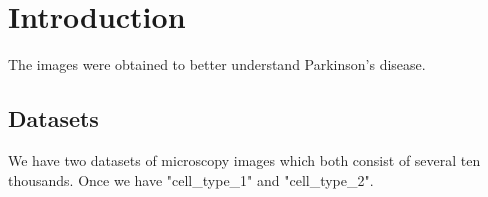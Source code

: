 

\chapter{Introduction}\label{ch:intro}



The images were obtained to better understand Parkinson's disease.


\section{Datasets}\label{sec:dataset}

We have two datasets of microscopy images which both consist of several ten thousands.
Once we have "cell_type_1" and "cell_type_2".


